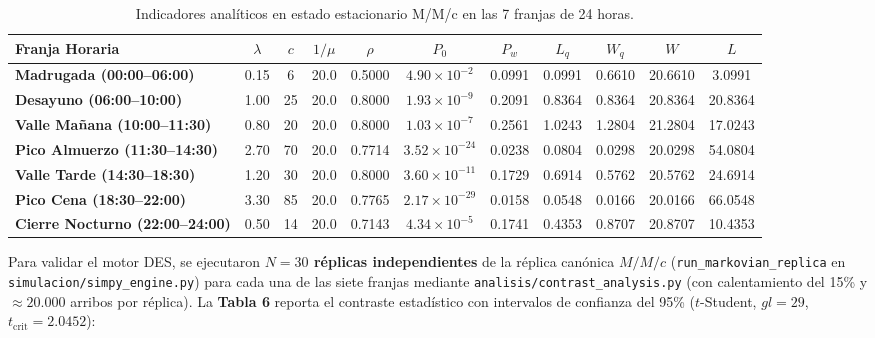 \documentclass[11pt,letterpaper]{article}
\begin{document}
\begin{table}[htbp]
\centering
\small
\caption{Indicadores analíticos en estado estacionario M/M/c en las 7 franjas de 24 horas.}
\begin{tabularx}{\textwidth}{l c c c c c c c c c c}
\toprule
\textbf{Franja Horaria} & $\lambda$ & $c$ & $1/\mu$ & $\rho$ & $P_0$ & $P_w$ & $L_q$ & $W_q$ & $W$ & $L$ \\
\midrule
\textbf{Madrugada (00:00–06:00)} & 0.15 & 6 & 20.0 & 0.5000 & $4.90 \times 10^{-2}$ & 0.0991 & 0.0991 & 0.6610 & 20.6610 & 3.0991 \\
\textbf{Desayuno (06:00–10:00)} & 1.00 & 25 & 20.0 & 0.8000 & $1.93 \times 10^{-9}$ & 0.2091 & 0.8364 & 0.8364 & 20.8364 & 20.8364 \\
\textbf{Valle Mañana (10:00–11:30)} & 0.80 & 20 & 20.0 & 0.8000 & $1.03 \times 10^{-7}$ & 0.2561 & 1.0243 & 1.2804 & 21.2804 & 17.0243 \\
\textbf{Pico Almuerzo (11:30–14:30)} & 2.70 & 70 & 20.0 & 0.7714 & $3.52 \times 10^{-24}$ & 0.0238 & 0.0804 & 0.0298 & 20.0298 & 54.0804 \\
\textbf{Valle Tarde (14:30–18:30)} & 1.20 & 30 & 20.0 & 0.8000 & $3.60 \times 10^{-11}$ & 0.1729 & 0.6914 & 0.5762 & 20.5762 & 24.6914 \\
\textbf{Pico Cena (18:30–22:00)} & 3.30 & 85 & 20.0 & 0.7765 & $2.17 \times 10^{-29}$ & 0.0158 & 0.0548 & 0.0166 & 20.0166 & 66.0548 \\
\textbf{Cierre Nocturno (22:00–24:00)} & 0.50 & 14 & 20.0 & 0.7143 & $4.34 \times 10^{-5}$ & 0.1741 & 0.4353 & 0.8707 & 20.8707 & 10.4353 \\
\bottomrule
\end{tabularx}
\end{table}

\noindent Para validar el motor DES, se ejecutaron \textbf{$N = 30$ réplicas independientes} de la réplica canónica $M/M/c$ (\texttt{run\_markovian\_replica} en \texttt{simulacion/simpy\_engine.py}) para cada una de las siete franjas mediante \texttt{analisis/contrast\_analysis.py} (con calentamiento del 15\% y $\approx 20.000$ arribos por réplica). La \textbf{Tabla 6} reporta el contraste estadístico con intervalos de confianza del 95\% ($t$-Student, $gl=29$, $t_{\text{crit}} = 2.0452$):
\end{document}
